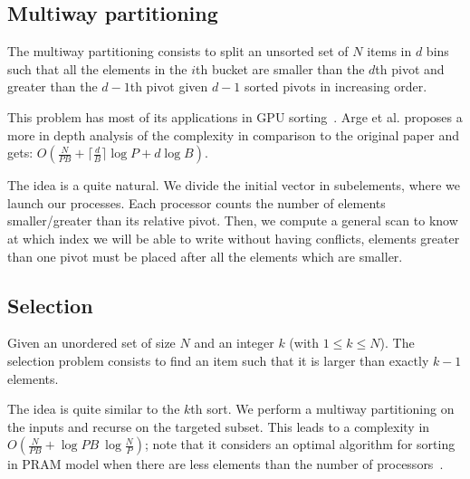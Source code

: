 \subsection{Multiway partitioning}\label{sec:MultiwayPartitioning}


The multiway partitioning consists to split an unsorted set of $N$ items in $d$ bins such that all the elements in the $i$th bucket are smaller than the $d$th pivot and greater than the $d-1$th pivot given $d-1$ sorted pivots in increasing order.

This problem has most of its applications in GPU sorting~\cite{cederman2008practical}. Arge et al. proposes a more in depth analysis of the complexity in comparison to the original paper and gets: $O(\frac{N}{PB} + \lceil \frac{d}{B} \rceil \log P + d \log B)$.

The idea is a quite natural. We divide the initial vector in subelements, where we launch our processes. Each processor counts the number of elements smaller/greater than its relative pivot. Then, we compute a general scan to know at which index we will be able to write without having conflicts, elements greater than one pivot must be placed after all the elements which are smaller.

\subsection{Selection}

Given an unordered set of size $N$ and an integer $k$ (with $1 \leq k \leq N$). The selection problem consists to find an item such that it is larger than exactly $k - 1$ elements.

The idea is quite similar to the $k$th sort. We perform a multiway partitioning on the inputs and recurse on the targeted subset. This leads to a complexity in $O(\frac{N}{PB} + \log PB ~ \log \frac{N}{P})$; note that it considers an optimal algorithm for sorting in PRAM model when there are less elements than the number of processors~\cite{arge2008fundamental}.

